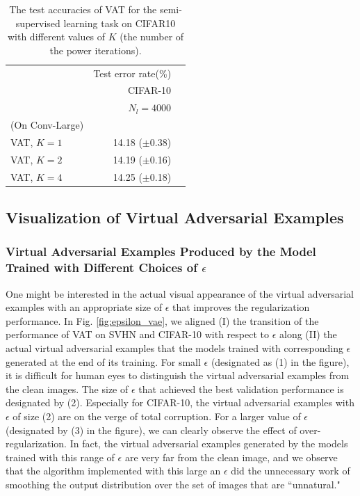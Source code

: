 \documentclass[10pt,journal,compsoc]{IEEEtran}
\begin{document}
\begin{table}[ht]
  \centering
		\caption{\label{tab:semisup_cifar10_poweriter} 
        The test accuracies of VAT for the semi-supervised learning task on CIFAR10 with different values of $K$ (the number of the power iterations). }
		\begin{tabular}{lrr}
			\toprule
			\multirow{2}{*}{} & \multicolumn{1}{c}{Test error rate(\%)}  \\
		     & CIFAR-10 \\
             & $N_l=4000$ \\
\midrule
            (On Conv-Large)\\
			VAT, $K=1$ & 14.18 ($\pm$0.38)\\
            VAT, $K=2$ & 14.19 ($\pm$0.16)\\
            VAT, $K=4$ & 14.25 ($\pm$0.18)\\
			\bottomrule
		\end{tabular}
\end{table}



\subsection{Visualization of Virtual Adversarial Examples}
\subsubsection{Virtual Adversarial Examples Produced by the Model Trained with Different Choices of $\epsilon$}
One might be interested in the actual visual appearance of the virtual adversarial examples with an appropriate size of $\epsilon$ that improves the regularization performance. 
In Fig. \ref{fig:epsilon_vae}, we aligned (I) the transition of the performance of VAT on SVHN and CIFAR-10 with respect to $\epsilon$ along (II) the actual virtual adversarial examples that the models trained with corresponding $\epsilon$ generated at the end of its training. 
For small $\epsilon$ (designated as (1) in the figure), it is difficult for human eyes to distinguish the virtual adversarial examples from the clean images. 
The size of $\epsilon$ that achieved the best validation performance is designated by (2).  
Especially for CIFAR-10, the virtual adversarial examples with $\epsilon$ of size (2) are on the verge of total corruption.   
For a larger value of $\epsilon$ (designated by (3) in the figure), we can clearly observe the effect of over-regularization. 
In fact, the virtual adversarial examples generated by the models trained with this range of $\epsilon$ are very far from the clean image, and we observe that the algorithm implemented with this large an $\epsilon$ did the unnecessary work of smoothing the output distribution over the set of images that are ``unnatural." 
\end{document}
